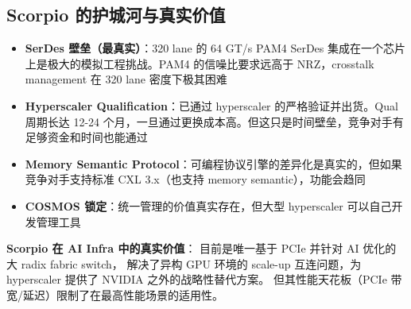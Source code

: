 \subsection{Scorpio 的护城河与真实价值}

\begin{itemize}
    \item \textbf{SerDes 壁垒（最真实）}：320 lane 的 64 GT/s PAM4 SerDes 集成在一个芯片上是极大的模拟工程挑战。PAM4 的信噪比要求远高于 NRZ，crosstalk management 在 320 lane 密度下极其困难
    \item \textbf{Hyperscaler Qualification}：已通过 hyperscaler 的严格验证并出货。Qual 周期长达 12-24 个月，一旦通过更换成本高。但这只是时间壁垒，竞争对手有足够资金和时间也能通过
    \item \textbf{Memory Semantic Protocol}：可编程协议引擎的差异化是真实的，但如果竞争对手支持标准 CXL 3.x（也支持 memory semantic），功能会趋同
    \item \textbf{COSMOS 锁定}：统一管理的价值真实存在，但大型 hyperscaler 可以自己开发管理工具
\end{itemize}

\textbf{Scorpio 在 AI Infra 中的真实价值}：
目前是唯一基于 PCIe 并针对 AI 优化的大 radix fabric switch，
解决了异构 GPU 环境的 scale-up 互连问题，为 hyperscaler 提供了 NVIDIA 之外的战略性替代方案。
但其性能天花板（PCIe 带宽/延迟）限制了在最高性能场景的适用性。
